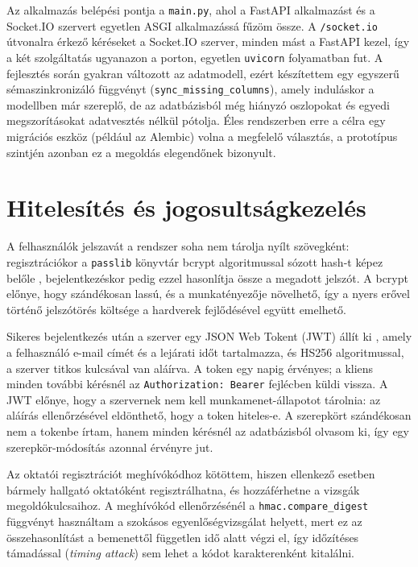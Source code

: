 Az alkalmazás belépési pontja a \texttt{main.py}, ahol a FastAPI alkalmazást és a Socket.IO
szervert egyetlen ASGI alkalmazássá fűzöm össze. A \texttt{/socket.io} útvonalra érkező
kéréseket a Socket.IO szerver, minden mást a FastAPI kezel, így a két szolgáltatás ugyanazon a
porton, egyetlen \texttt{uvicorn} folyamatban fut. A fejlesztés során gyakran változott az
adatmodell, ezért készítettem egy egyszerű sémaszinkronizáló függvényt
(\texttt{sync\_missing\_columns}), amely induláskor a modellben már szereplő, de az adatbázisból
még hiányzó oszlopokat és egyedi megszorításokat adatvesztés nélkül pótolja. Éles rendszerben
erre a célra egy migrációs eszköz (például az Alembic) volna a megfelelő választás, a prototípus
szintjén azonban ez a megoldás elegendőnek bizonyult.

\section{Hitelesítés és jogosultságkezelés}

A felhasználók jelszavát a rendszer soha nem tárolja nyílt szövegként: regisztrációkor a
\texttt{passlib} könyvtár bcrypt algoritmussal sózott hash-t képez belőle
\cite{provos1999bcrypt}, bejelentkezéskor pedig ezzel hasonlítja össze a megadott jelszót. A
bcrypt előnye, hogy szándékosan lassú, és a munkatényezője növelhető, így a nyers erővel történő
jelszótörés költsége a hardverek fejlődésével együtt emelhető.

Sikeres bejelentkezés után a szerver egy JSON Web Tokent (JWT) állít ki \cite{rfc7519}, amely a
felhasználó e-mail címét és a lejárati időt tartalmazza, és HS256 algoritmussal, a szerver titkos
kulcsával van aláírva. A token egy napig érvényes; a kliens minden további kérésnél az
\texttt{Authorization: Bearer} fejlécben küldi vissza. A JWT előnye, hogy a szervernek nem kell
munkamenet-állapotot tárolnia: az aláírás ellenőrzésével eldönthető, hogy a token hiteles-e. A
szerepkört szándékosan nem a tokenbe írtam, hanem minden kérésnél az adatbázisból olvasom ki,
így egy szerepkör-módosítás azonnal érvényre jut.

Az oktatói regisztrációt meghívókódhoz kötöttem, hiszen ellenkező esetben bármely hallgató
oktatóként regisztrálhatna, és hozzáférhetne a vizsgák megoldókulcsaihoz. A meghívókód
ellenőrzésénél a \texttt{hmac.compare\_digest} függvényt használtam a szokásos egyenlőségvizsgálat
helyett, mert ez az összehasonlítást a bemenettől független idő alatt végzi el, így időzítéses
támadással (\textit{timing attack}) sem lehet a kódot karakterenként kitalálni.

